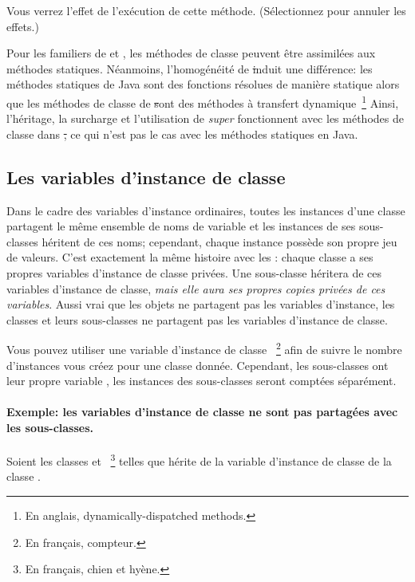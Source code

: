 \documentclass[a4paper,10pt,twoside]{book}
\begin{document}
Vous verrez l'effet de l'ex\'ecution de cette m\'ethode.  (S\'electionnez  pour annuler les effets.)

Pour les familiers de  et ,  les m\'ethodes de classe peuvent \^etre assimil\'ees aux m\'ethodes statiques. 
N\'eanmoins, l'homog\'en\'eit\'e de \st induit une diff\'erence:  les m\'ethodes statiques de Java sont des fonctions r\'esolues de mani\`ere statique alors que les m\'ethodes de classe de \st sont des m\'ethodes \`a transfert dynamique~\footnote{En anglais, dynamically-dispatched methods.} Ainsi, l'h\'eritage, la surcharge et l'utilisation de \emph{super} fonctionnent avec les m\'ethodes de classe dans \st, ce qui n'est pas le cas avec les m\'ethodes statiques en Java.  

\subsection{Les variables d'instance de classe}
Dans le cadre des variables d'instance ordinaires,
toutes les instances d'une classe partagent le m\^eme ensemble
de noms de variable et les instances de ses sous-classes h\'eritent
de ces noms; cependant, chaque instance poss\`ede son propre jeu de valeurs.
C'est exactement la m\^eme histoire avec les : chaque classe a ses propres variables d'instance de classe priv\'ees.
Une sous-classe h\'eritera de ces  variables d'instance de classe, \emph{mais elle aura ses propres copies priv\'ees de ces variables}.
Aussi vrai que les objets ne partagent pas les variables d'instance, les classes et leurs sous-classes ne partagent pas les variables d'instance de classe.

Vous pouvez utiliser une variable d'instance de classe ~\footnote{En fran\c{c}ais, compteur.} afin de suivre le nombre d'instances vous cr\'eez pour une classe donn\'ee.
Cependant, les sous-classes ont leur propre variable , 
les instances des sous-classes seront compt\'ees s\'epar\'ement.

\paragraph{Exemple: les variables d'instance de classe ne sont pas partag\'ees avec les sous-classes.}
Soient les classes  et ~\footnote{En fran\c{c}ais, chien et hy\`ene.} telles que  h\'erite de la variable d'instance de classe  de la classe .
\end{document}
